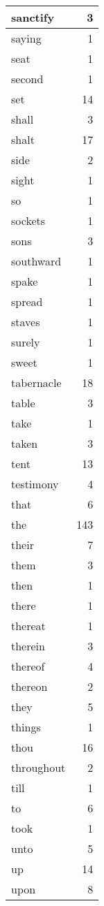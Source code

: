 \begin{center}
\begin{longtable}{l|r}
sanctify & 3 \\ \hline
saying & 1 \\ \hline
seat & 1 \\ \hline
second & 1 \\ \hline
set & 14 \\ \hline
shall & 3 \\ \hline
shalt & 17 \\ \hline
side & 2 \\ \hline
sight & 1 \\ \hline
so & 1 \\ \hline
sockets & 1 \\ \hline
sons & 3 \\ \hline
southward & 1 \\ \hline
spake & 1 \\ \hline
spread & 1 \\ \hline
staves & 1 \\ \hline
surely & 1 \\ \hline
sweet & 1 \\ \hline
tabernacle & 18 \\ \hline
table & 3 \\ \hline
take & 1 \\ \hline
taken & 3 \\ \hline
tent & 13 \\ \hline
testimony & 4 \\ \hline
that & 6 \\ \hline
the & 143 \\ \hline
their & 7 \\ \hline
them & 3 \\ \hline
then & 1 \\ \hline
there & 1 \\ \hline
thereat & 1 \\ \hline
therein & 3 \\ \hline
thereof & 4 \\ \hline
thereon & 2 \\ \hline
they & 5 \\ \hline
things & 1 \\ \hline
thou & 16 \\ \hline
throughout & 2 \\ \hline
till & 1 \\ \hline
to & 6 \\ \hline
took & 1 \\ \hline
unto & 5 \\ \hline
up & 14 \\ \hline
upon & 8 \\ \hline

\end{longtable}
\end{center}
